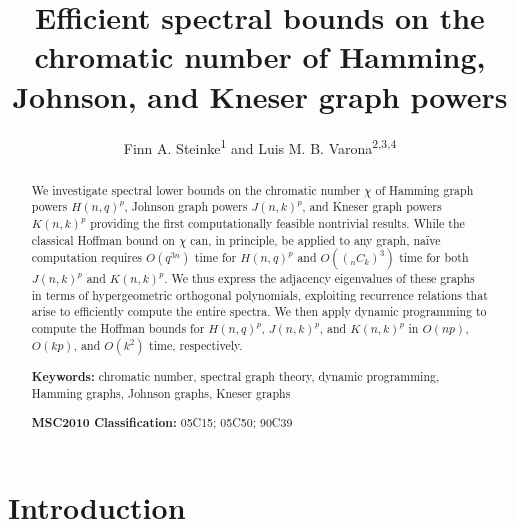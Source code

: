 \documentclass{article}
\numberwithin{equation}{section}
\theoremstyle{plain}
\begin{document}
\title{
  Efficient spectral bounds on the chromatic number of Hamming,
  Johnson, and Kneser graph powers
}

\author{
  Finn A. Steinke\textsuperscript{1} and Luis M. B.
  Varona\textsuperscript{2,3,4}
}

\maketitle

\begin{abstract}
  We investigate spectral lower bounds on the chromatic number $\chi$
  of Hamming graph powers $H(n, q)^p$, Johnson graph powers $J(n,
  k)^p$, and Kneser graph powers $K(n, k)^p$ providing the first
  computationally feasible nontrivial results. While the classical
  Hoffman bound on $\chi$ can, in principle, be applied to any graph,
  na\"ive computation requires $O(q^{3n})$ time for $H(n, q)^p$ and
  $O(({}_nC_k)^3)$ time for both $J(n, k)^p$ and $K(n, k)^p$. We thus
  express the adjacency eigenvalues of these graphs in terms of
  hypergeometric orthogonal polynomials, exploiting recurrence
  relations that arise to efficiently compute the entire spectra. We
  then apply dynamic programming to compute the Hoffman bounds for
  $H(n, q)^p$, $J(n, k)^p$, and $K(n, k)^p$ in $O(np)$, $O(kp)$, and
  $O(k^2)$ time, respectively.\\\medskip

  \noindent \textbf{Keywords:} chromatic number, spectral graph
  theory, dynamic programming, Hamming graphs, Johnson graphs, Kneser graphs

  \noindent \textbf{MSC2010 Classification:}
  05C15; %
  05C50; %
  90C39  %
\end{abstract}

\addtocounter{footnote}{1}
\addtocounter{footnote}{1}
\addtocounter{footnote}{1}
\addtocounter{footnote}{1}

\section{Introduction}\label{section:1}
\end{document}
